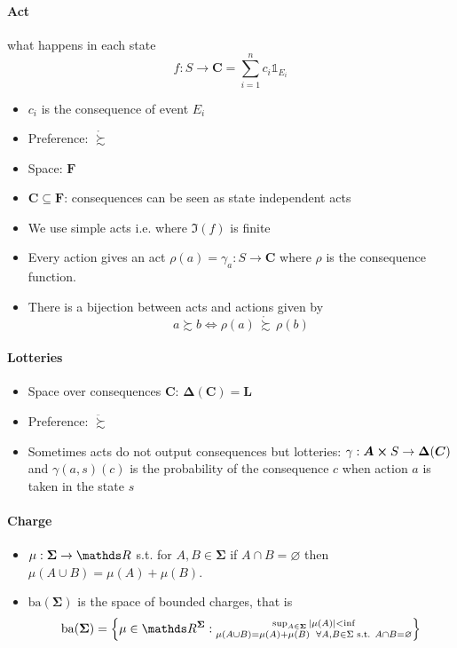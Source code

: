 \documentclass[landscape, 12pt]{extarticle}
\begin{document}
\begin{multicols}{2}
	\paragraph{Act} what happens in each state
	\[
		f: S \to \bm C = \sum^n_{i = 1} c_i \mathds 1_{E_i}
	\]
	\begin{itemize}
		\item $c_i$ is the consequence of event $E_i$
		\item Preference: $\mathring \succsim$
		\item Space: $\bm F$
		\item $\bm C \subseteq \bm F$: consequences can be seen as state independent acts
		\item We use simple acts i.e. where $\Im(f)$ is finite
		\item Every action gives an act $\rho(a) = \gamma_a: S \to \bm C$
		      where $\rho$ is the consequence function.
		\item There is a bijection between acts and actions given by
		      \[
			      a \succsim b \iff \rho(a) \, \mathring \succsim \, \rho(b)
		      \]
	\end{itemize}

	\paragraph{Lotteries}
	\begin{itemize}
		\item Space over consequences $\bm C$: $\bm \Delta(\bm C) = \bm L$
		\item Preference: $\ddot \succsim$
		\item Sometimes acts do not output consequences but lotteries:
		      $\gamma: \bm A \cross S \to \bm \Delta(\bm C)$ and $\gamma(a, s)(c)$ is the probability
		      of the consequence $c$ when action $a$ is taken in the state $s$
	\end{itemize}

	\paragraph{Charge}
	\begin{itemize}
		\item $\mu : \bm \Sigma \to \R$ s.t. for $A, B \in \bm \Sigma$ if $A \cap B = \varnothing$
		      then $\mu(A \cup B) = \mu(A) + \mu(B)$.
		\item $\mathrm{ba}(\bm \Sigma)$ is the space of bounded charges, that is
		      \[
			      \mathrm{ba}(\bm \Sigma) = \left\{
			      \mu \in \R^{\bm \Sigma}:
			      \substack{
				      \sup_{A \in \bm \Sigma} \abs{\mu(A)} < \inf \\
				      \mu(A \cup B) = \mu(A) + \mu(B) \enspace \forall A, B \in \Sigma \text{ s.t. } A \cap B = \varnothing
			      }
			      \right\}
		      \]
	\end{itemize}


\end{multicols}
\end{document}
